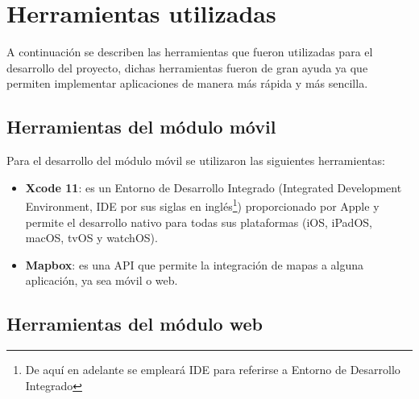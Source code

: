 \section{Herramientas utilizadas}
A continuación se describen las herramientas que fueron utilizadas para el desarrollo del proyecto, dichas herramientas fueron de gran ayuda ya que permiten implementar aplicaciones de manera más rápida y más sencilla. 

\subsection{Herramientas del módulo móvil}

Para el desarrollo del módulo móvil se utilizaron las siguientes herramientas:

\begin{itemize}
	
	\item \textbf{Xcode 11}: es un Entorno de Desarrollo Integrado (Integrated Development Environment, IDE por sus siglas en inglés\footnote{De aquí en adelante se empleará IDE para referirse a Entorno de Desarrollo Integrado}) proporcionado por Apple y permite el desarrollo nativo para todas sus plataformas (iOS, iPadOS, macOS, tvOS y watchOS)\cite{xcode}.
	
	\item \textbf{Mapbox}: es una API que permite la integración de mapas a alguna aplicación, ya sea móvil o web\cite{mapbox}.
	
\end{itemize}

\subsection{Herramientas del módulo web}